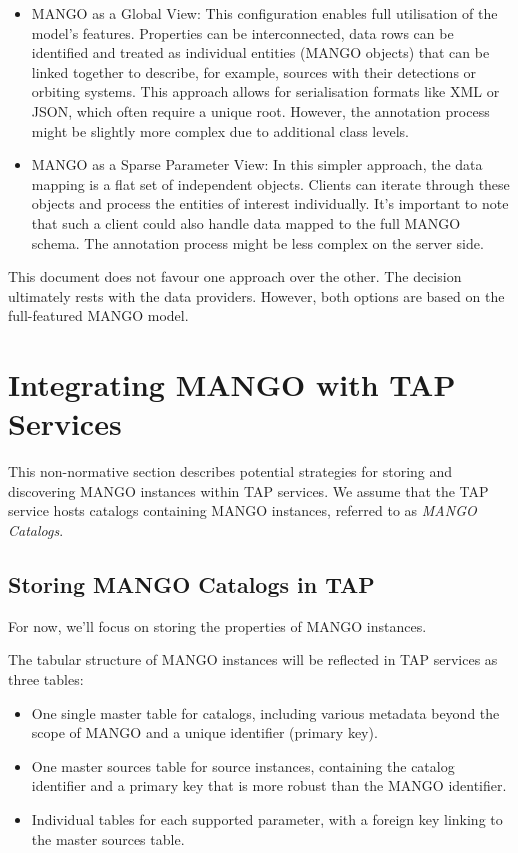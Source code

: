 \documentclass[11pt,a4paper]{ivoa}
\begin{document}
\begin{itemize}[noitemsep,topsep=0pt,parsep=0pt,partopsep=0pt]
    \item MANGO as a Global View: This configuration enables full utilisation of the 
          model's features. Properties can be interconnected, data rows can be identified
          and treated as individual entities (MANGO objects) that can be linked together to describe,
          for example, sources with their detections or orbiting systems.
          This approach allows for serialisation formats like XML or JSON, which often require
          a unique root.
          However, the annotation process might be slightly more complex due to additional class levels.
    \item MANGO as a Sparse Parameter View: In this simpler approach, the data mapping is a
          flat set of independent objects. Clients can iterate through these objects and process
          the entities of interest individually.
          It's important to note that such a client could also handle data mapped to the full MANGO schema.
          The annotation process might be less complex on the server side.
\end{itemize}

This document does not favour one approach over the other.
The decision ultimately rests with the data providers.
However, both options are based on the full-featured MANGO model.




\section{Integrating MANGO with TAP Services}

This non-normative section describes potential strategies for
storing and discovering MANGO instances within TAP services.
We assume that the TAP service hosts catalogs containing MANGO instances,
referred to as  \emph{MANGO Catalogs}.

\subsection{Storing MANGO Catalogs in TAP}
For now, we'll focus on storing the properties of MANGO instances. 

The tabular structure of MANGO instances will be reflected in TAP services as three tables:

\begin{itemize}
  \item One single master table for catalogs, including various metadata beyond the scope of
        MANGO and a unique identifier (primary key).
  \item One master sources table for source instances, containing the catalog identifier
        and a primary key that is more robust than the MANGO identifier.
  \item Individual tables for each supported parameter, with a foreign key
        linking to the master sources table.
\end{itemize}
\end{document}
